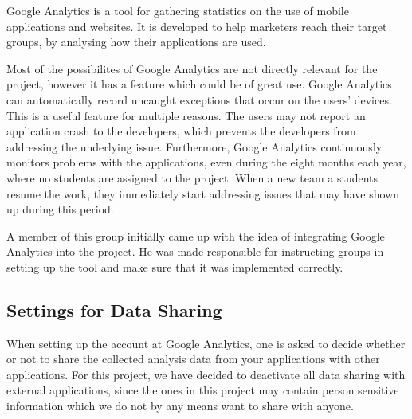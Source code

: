Google Analytics is a tool for gathering statistics on the use of mobile applications and websites. 
It is developed to help marketers reach their target groups, by analysing how their applications are used.

Most of the possibilites of Google Analytics are not directly relevant for the \giraf project, however it has a feature which could be of great use.
Google Analytics can automatically record uncaught exceptions that occur on the users' devices.
This is a useful feature for multiple reasons. 
The users may not report an application crash to the developers, which prevents the developers from addressing the underlying issue. 
Furthermore, Google Analytics continuously monitors problems with the applications, even during the eight months each year, where no students are assigned to the project. 
When a new team a students resume the work, they immediately start addressing issues that may have shown up during this period.

A member of this group initially came up with the idea of integrating Google Analytics into the \giraf project.
He was made responsible for instructing groups in setting up the tool and make sure that it was implemented correctly.





\subsection{Settings for Data Sharing}
When setting up the account at Google Analytics, one is asked to decide whether or not to share the collected analysis data from your applications with other applications.
For this project, we have decided to deactivate all data sharing with external applications, since the ones in this project may contain person sensitive information which we do not by any means want to share with anyone.